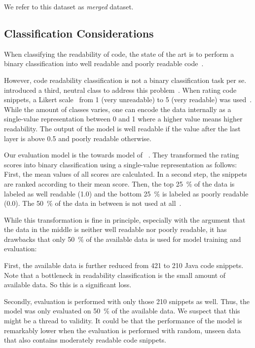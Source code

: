 \documentclass[%
class=scrreprt,
chapterprefix=false,%
open=right,%
twoside=false,%
paper=a4,%
logofile={Logo\_zentral\_farbig\_EN.png},%
thesistype=master,%
UKenglish,%
]{se2thesis}
\theoremstyle{definition}
\newcommand{\citeolddataset}{\cite{buse2009learning, dorn2012general, scalabrino2018comprehensive}\xspace}
\begin{document}
	We refer to this dataset as \textit{merged} dataset.
	
\subsection{Classification Considerations} \label{Classification Considerations}
	
	When classifying the readability of code, the state of the art is to perform a binary classification into well readable and poorly readable code~\cite{mi2018inception, mi2018improving, sharma2020egan, mi2022towards, mi2022rank}. 
	
	However, code readability classification is not a binary classification task per se. \citeauthor{mi2023graph} introduced a third, neutral class to address this problem~\cite{mi2023graph}. 
	When rating code snippets, a Likert scale~\cite{likert1932technique} from 1 (very unreadable) to 5 (very readable) was used~\citeolddataset. 
	While the amount of classes varies, one can encode the data internally as a single-value representation between 0 and 1 where a higher value means higher readability. The output of the model is well readable if the value after the last layer is above 0.5 and poorly readable otherwise.
	
	Our evaluation model is the towards model of \citeauthor{mi2022towards}~\cite{mi2022towards}. They transformed the rating scores into binary classification using a single-value representation as follows: First, the mean values of all scores are calculated. In a second step, the snippets are ranked according to their mean score. Then, the top 25~\% of the data is labeled as well readable (1.0) and the bottom 25~\% is labeled as poorly readable (0.0). The 50~\% of the data in between is not used at all~\cite{mi2022towards}.
	
	While this transformation is fine in principle, especially with the argument that the data in the middle is neither well readable nor poorly readable, it has drawbacks that only 50~\% of the available data is used for model training and evaluation:
	
	First, the available data is further reduced from 421 to 210 Java code snippets. Note that a bottleneck in readability classification is the small amount of available data. So this is a significant loss.
	
	Secondly, evaluation is performed with only those 210 snippets as well. Thus, the model was only evaluated on 50~\% of the available data. We suspect that this might be a thread to validity. It could be that the performance of the model is remarkably lower when the evaluation is performed with random, unseen data that also contains moderately readable code snippets.
	
\end{document}
